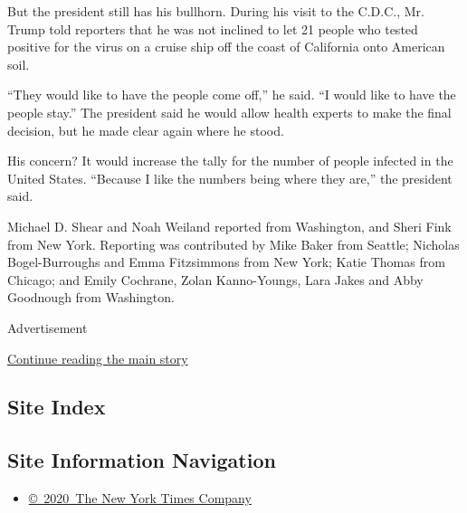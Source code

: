 But the president still has his bullhorn. During his visit to the
C.D.C., Mr. Trump told reporters that he was not inclined to let 21
people who tested positive for the virus on a cruise ship off the coast
of California onto American soil.

``They would like to have the people come off,'' he said. ``I would like
to have the people stay.'' The president said he would allow health
experts to make the final decision, but he made clear again where he
stood.

His concern? It would increase the tally for the number of people
infected in the United States. ``Because I like the numbers being where
they are,'' the president said.

Michael D. Shear and Noah Weiland reported from Washington, and Sheri
Fink from New York. Reporting was contributed by Mike Baker from
Seattle; Nicholas Bogel-Burroughs and Emma Fitzsimmons from New York;
Katie Thomas from Chicago; and Emily Cochrane, Zolan Kanno-Youngs, Lara
Jakes and Abby Goodnough from Washington.

Advertisement

\protect\hyperlink{after-bottom}{Continue reading the main story}

\hypertarget{site-index}{%
\subsection{Site Index}\label{site-index}}

\hypertarget{site-information-navigation}{%
\subsection{Site Information
Navigation}\label{site-information-navigation}}

\begin{itemize}
\tightlist
\item
  \href{https://help.nytimes3xbfgragh.onion/hc/en-us/articles/115014792127-Copyright-notice}{©~2020~The
  New York Times Company}
\end{itemize}


